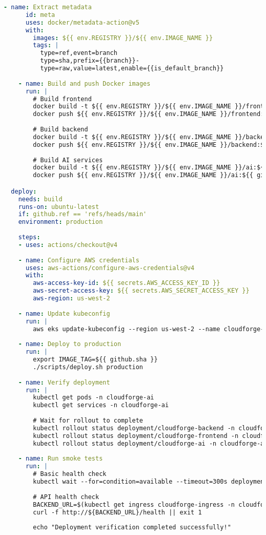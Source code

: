 \begin{lstlisting}[language=yaml]
    - name: Extract metadata
      id: meta
      uses: docker/metadata-action@v5
      with:
        images: ${{ env.REGISTRY }}/${{ env.IMAGE_NAME }}
        tags: |
          type=ref,event=branch
          type=sha,prefix={{branch}}-
          type=raw,value=latest,enable={{is_default_branch}}
    
    - name: Build and push Docker images
      run: |
        # Build frontend
        docker build -t ${{ env.REGISTRY }}/${{ env.IMAGE_NAME }}/frontend:${{ github.sha }} ./frontend
        docker push ${{ env.REGISTRY }}/${{ env.IMAGE_NAME }}/frontend:${{ github.sha }}
        
        # Build backend
        docker build -t ${{ env.REGISTRY }}/${{ env.IMAGE_NAME }}/backend:${{ github.sha }} ./backend
        docker push ${{ env.REGISTRY }}/${{ env.IMAGE_NAME }}/backend:${{ github.sha }}
        
        # Build AI services
        docker build -t ${{ env.REGISTRY }}/${{ env.IMAGE_NAME }}/ai:${{ github.sha }} ./ai-scripts
        docker push ${{ env.REGISTRY }}/${{ env.IMAGE_NAME }}/ai:${{ github.sha }}

  deploy:
    needs: build
    runs-on: ubuntu-latest
    if: github.ref == 'refs/heads/main'
    environment: production
    
    steps:
    - uses: actions/checkout@v4
    
    - name: Configure AWS credentials
      uses: aws-actions/configure-aws-credentials@v4
      with:
        aws-access-key-id: ${{ secrets.AWS_ACCESS_KEY_ID }}
        aws-secret-access-key: ${{ secrets.AWS_SECRET_ACCESS_KEY }}
        aws-region: us-west-2
    
    - name: Update kubeconfig
      run: |
        aws eks update-kubeconfig --region us-west-2 --name cloudforge-cluster
    
    - name: Deploy to production
      run: |
        export IMAGE_TAG=${{ github.sha }}
        ./scripts/deploy.sh production
    
    - name: Verify deployment
      run: |
        kubectl get pods -n cloudforge-ai
        kubectl get services -n cloudforge-ai
        
        # Wait for rollout to complete
        kubectl rollout status deployment/cloudforge-backend -n cloudforge-ai --timeout=600s
        kubectl rollout status deployment/cloudforge-frontend -n cloudforge-ai --timeout=600s
        kubectl rollout status deployment/cloudforge-ai -n cloudforge-ai --timeout=600s
    
    - name: Run smoke tests
      run: |
        # Basic health check
        kubectl wait --for=condition=available --timeout=300s deployment/cloudforge-backend -n cloudforge-ai
        
        # API health check
        BACKEND_URL=$(kubectl get ingress cloudforge-ingress -n cloudforge-ai -o jsonpath='{.status.loadBalancer.ingress[0].hostname}')
        curl -f http://${BACKEND_URL}/health || exit 1
        
        echo "Deployment verification completed successfully!"
\end{lstlisting}

